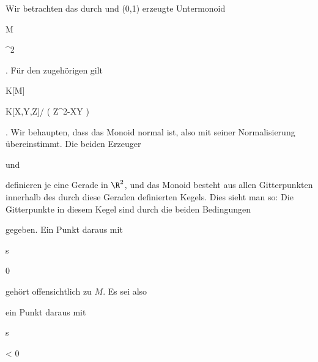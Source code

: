 {


Wir betrachten das durch   {  und  }  { (0,1)   }{ } erzeugte Untermonoid


\mavergleichskette

{\vergleichskette

{M
}

{ \subseteq }{ \Z^2
}

{  }{
}

{    }{
}

{   }{
}

}
{}{}{.}
Für den zugehörigen
gilt


\mavergleichskette

{\vergleichskette

{ K[M]
}

{ \cong }{ K[X,Y,Z]/ \left(  Z^2-XY  \right)
}

{  }{
}

{    }{
}

{   }{
}

}
{}{}{.}
Wir behaupten, dass das Monoid normal ist, also mit seiner Normalisierung übereinstimmt. Die beiden Erzeuger

 und

 definieren je eine Gerade in $\R^2$, und das Monoid besteht aus allen Gitterpunkten
 {} {}
innerhalb des durch diese Geraden definierten Kegels. Dies sieht man so: Die Gitterpunkte in diesem Kegel sind durch die beiden Bedingungen


 {  }


gegeben. Ein Punkt daraus mit


\mavergleichskette

{\vergleichskette

{s
}

{ \geq }{ 0
}

{  }{
}

{    }{
}

{   }{
}

}
{}{}{}
gehört offensichtlich zu $M$. Es sei also

 ein Punkt daraus mit


\mavergleichskette

{\vergleichskette

{s
}

{ < }{ 0
}

}}
